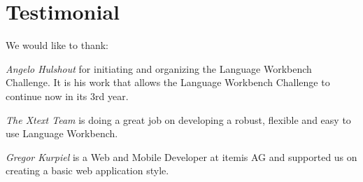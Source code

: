 \section*{Testimonial}
\label{sec:testimonial}

We would like to thank:
\begin{compactenum}
  \item \emph{Angelo Hulshout} for initiating and organizing the Language
  Workbench Challenge. It is his work that allows the Language Workbench
  Challenge to continue now in its 3rd year.
  \item \emph{The Xtext Team} is doing a great job on developing a robust,
  flexible and easy to use Language Workbench. 
  \item \emph{Gregor Kurpiel} is a Web and Mobile Developer at itemis AG and
  supported us on creating a basic web application style.
\end{compactenum}
